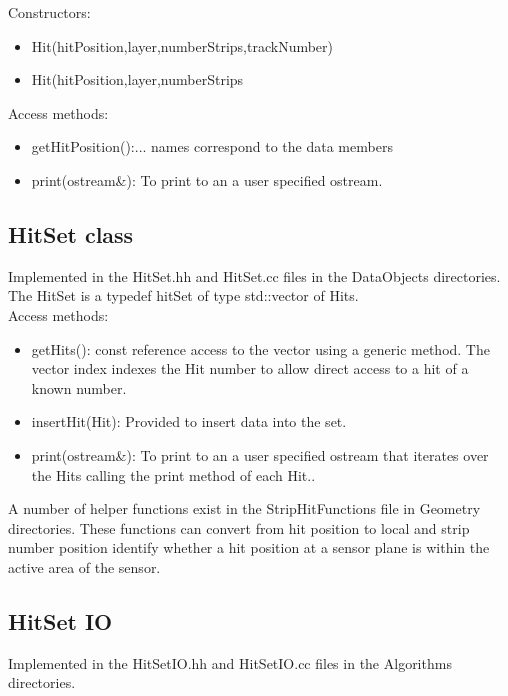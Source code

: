 \documentclass[aps,prd,superscriptaddress,floatfix]{revtex4}
\begin{document}
Constructors:

\begin{itemize}
\item Hit(hitPosition,layer,numberStrips,trackNumber)
\item Hit(hitPosition,layer,numberStrips
\end{itemize}

Access methods:
\begin{itemize}
\item getHitPosition():... names correspond to the data members
\item print(ostream\&): To print to an a user specified ostream.
\end{itemize}


\subsection{HitSet class}
Implemented in the HitSet.hh and HitSet.cc files in the DataObjects directories.
\\

The HitSet is a typedef hitSet of type std::vector of Hits.
\\

Access methods:

\begin{itemize}
\item getHits(): const reference access to the vector using a generic method.
The vector index indexes the Hit number to allow direct access to a hit of a known number.

\item insertHit(Hit): Provided to insert data into the set.

\item print(ostream\&): To print to an a user specified ostream that iterates over
the Hits calling the print method of each Hit..
\end{itemize}


A number of helper functions exist in the StripHitFunctions file in Geometry directories.  These functions
can convert from hit position to local and strip number position  identify whether a hit position at a sensor
plane is within the active area of the sensor.

\subsection{HitSet IO}
Implemented in the HitSetIO.hh and HitSetIO.cc files in the Algorithms directories.
\\
\end{document}
